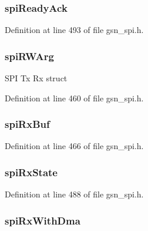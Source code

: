 \hypertarget{a00230_a7d64b559bc60710f2a2399d32349f735}{
\subsubsection[{spiReadyAck}]{ {\bf spiReadyAck}}}
\label{a00230_a7d64b559bc60710f2a2399d32349f735}


Definition at line 493 of file gsn\_\-spi.h.

\hypertarget{a00230_acb4512599754c80bddd73e9a02574f9e}{
\subsubsection[{spiRWArg}]{ {\bf spiRWArg}}}
\label{a00230_acb4512599754c80bddd73e9a02574f9e}
SPI Tx Rx struct 

Definition at line 460 of file gsn\_\-spi.h.

\hypertarget{a00230_a07362b10241aa321cb021f90e60ba4c8}{
\subsubsection[{spiRxBuf}]{ {\bf spiRxBuf}}}
\label{a00230_a07362b10241aa321cb021f90e60ba4c8}


Definition at line 466 of file gsn\_\-spi.h.

\hypertarget{a00230_a7ceab17fe911810e78fcb0b93fd7ec40}{
\subsubsection[{spiRxState}]{ {\bf spiRxState}}}
\label{a00230_a7ceab17fe911810e78fcb0b93fd7ec40}


Definition at line 488 of file gsn\_\-spi.h.

\hypertarget{a00230_a916c13efb27c773a6adcc6129fb9be8e}{
\subsubsection[{spiRxWithDma}]{ {\bf spiRxWithDma}}}
\label{a00230_a916c13efb27c773a6adcc6129fb9be8e}


